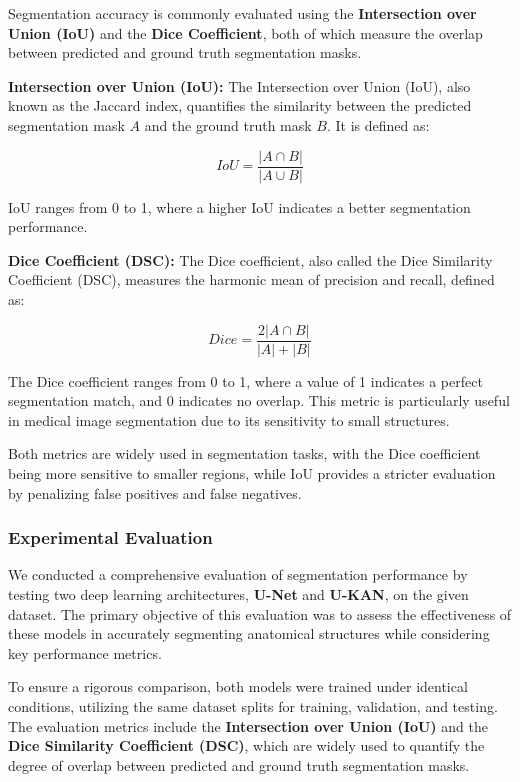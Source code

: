 \documentclass[conference]{IEEEtran}
\begin{document}
Segmentation accuracy is commonly evaluated using the \textbf{Intersection over
    Union (IoU)} and the \textbf{Dice Coefficient}, both of which measure the
overlap between predicted and ground truth segmentation masks.

\textbf{Intersection over Union (IoU):}
The Intersection over Union (IoU), also known as the Jaccard index, quantifies the similarity between the predicted segmentation mask \( A \) and the ground truth mask \( B \). It is defined as:

\begin{equation}
    IoU = \frac{|A \cap B|}{|A \cup B|}
\end{equation}

IoU ranges from 0 to 1, where a higher IoU indicates a better segmentation
performance.

\textbf{Dice Coefficient (DSC):}
The Dice coefficient, also called the Dice Similarity Coefficient (DSC), measures the harmonic mean of precision and recall, defined as:

\begin{equation}
    Dice = \frac{2|A \cap B|}{|A| + |B|}
\end{equation}

The Dice coefficient ranges from 0 to 1, where a value of 1 indicates a perfect
segmentation match, and 0 indicates no overlap. This metric is particularly
useful in medical image segmentation due to its sensitivity to small
structures.

Both metrics are widely used in segmentation tasks, with the Dice coefficient
being more sensitive to smaller regions, while IoU provides a stricter
evaluation by penalizing false positives and false negatives.

\subsubsection{Experimental Evaluation}
\vspace{1em}
We conducted a comprehensive evaluation of segmentation performance by testing two deep learning architectures, \textbf{U-Net} and \textbf{U-KAN}, on the given dataset. The primary objective of this evaluation was to assess the effectiveness of these models in accurately segmenting anatomical structures while considering key performance metrics.

To ensure a rigorous comparison, both models were trained under identical
conditions, utilizing the same dataset splits for training, validation, and
testing. The evaluation metrics include the \textbf{Intersection over Union
    (IoU)} and the \textbf{Dice Similarity Coefficient (DSC)}, which are widely
used to quantify the degree of overlap between predicted and ground truth
segmentation masks.
\end{document}
